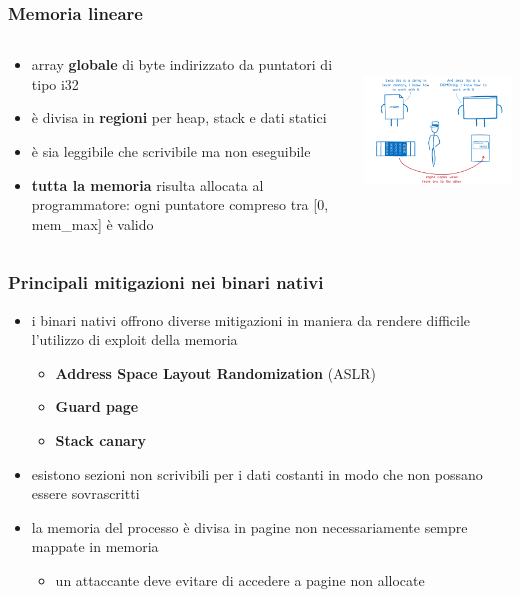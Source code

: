 \documentclass{beamer}
\begin{document}
\begin{frame}
  \frametitle{Memoria lineare}
  \begin{columns}
    \begin{column}{0.6\textwidth}
      \begin{itemize}
        \item array \textbf{globale} di byte indirizzato da puntatori di tipo i32
        \pause
        \item è divisa in \textbf{regioni} per heap, stack e dati statici
        \pause
        \item è sia leggibile che scrivibile ma non eseguibile 
        \pause
        \item \textbf{tutta la memoria} risulta allocata al programmatore: ogni puntatore compreso tra [0, mem\_max] è valido 
      \end{itemize}
    \end{column}
    \begin{column}{0.4\textwidth}
      \centerline{\includegraphics[width=8cm,height=4cm,keepaspectratio]{images/memman.png}}
    \end{column}
  \end{columns}
\end{frame}

\begin{frame}
  \frametitle{Principali mitigazioni nei binari nativi}
  \begin{itemize}
    \item i binari nativi offrono diverse mitigazioni in maniera da rendere
      difficile l'utilizzo di exploit della memoria
      \begin{itemize}
        \item \textbf{Address Space Layout Randomization} (ASLR)     
        \pause
        \item \textbf{Guard page}   
        \pause
        \item \textbf{Stack canary} 
      \end{itemize}
    \pause 
    \item esistono sezioni non scrivibili per i dati costanti in modo che
      non possano essere sovrascritti
    \pause
    \item la memoria del processo è divisa in pagine non necessariamente sempre
      mappate in memoria
      \begin{itemize}
        \item un attaccante deve evitare di accedere a pagine non allocate
      \end{itemize}
  \end{itemize}
\end{frame}
\end{document}
